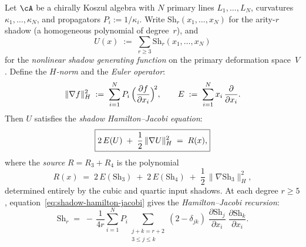 \begin{theorem}
\label{thm:hamilton-jacobi-shadow}
\ClaimStatusProvedHere
{}
Let $\cA$ be a chirally Koszul algebra with $N$ primary lines
$L_1, \dotsc, L_N$, curvatures
$\kappa_1, \dotsc, \kappa_N$, and propagators
$P_i := 1/\kappa_i$.  Write
$\mathrm{Sh}_r(x_1, \dotsc, x_N)$ for the arity-$r$ shadow
\textup{(}a homogeneous polynomial of degree~$r$\textup{)}, and
\[
  U(x) \;:=\; \sum_{r \geq 3} \mathrm{Sh}_r(x_1, \dotsc, x_N)
\]
for the \emph{nonlinear shadow generating function} on the
primary deformation space~$V$.  Define the \emph{$H$-norm}
and the \emph{Euler operator}:
\begin{equation}\label{eq:hj-operators}
  \|\nabla f\|_H^2
  \;:=\;
  \sum_{i=1}^N P_i\,
  \Bigl(\frac{\partial f}{\partial x_i}\Bigr)^{\!2},
  \qquad
  E \;:=\;
  \sum_{i=1}^N x_i\,\frac{\partial}{\partial x_i}.
\end{equation}
Then $U$ satisfies the \emph{shadow Hamilton--Jacobi equation}:
\begin{equation}\label{eq:shadow-hamilton-jacobi}
  \boxed{%
  2\,E(U)
  \;+\;
  \frac{1}{2}\,\|\nabla U\|_H^2
  \;=\;
  R(x),}
\end{equation}
where the \emph{source} $R = R_3 + R_4$ is the polynomial
\begin{equation}\label{eq:shadow-hj-source}
  R(x)
  \;=\;
  2\,E(\mathrm{Sh}_3)
  \;+\;
  2\,E(\mathrm{Sh}_4)
  \;+\;
  \frac{1}{2}\,\|\nabla \mathrm{Sh}_3\|_H^2,
\end{equation}
determined entirely by the cubic and quartic input shadows.
At each degree $r \geq 5$,
equation~\eqref{eq:shadow-hamilton-jacobi} gives the
\emph{Hamilton--Jacobi recursion}:
\begin{equation}\label{eq:shadow-hj-recursion}
  \mathrm{Sh}_r
  \;=\;
  -\,\frac{1}{4r}
  \sum_{i=1}^N P_i
  \!\!\!\sum_{\substack{j + k = r + 2 \\ 3 \leq j \leq k}}
  \!\!(2 - \delta_{jk})\;
  \frac{\partial \mathrm{Sh}_j}{\partial x_i}\;
  \frac{\partial \mathrm{Sh}_k}{\partial x_i}.
\end{equation}
\end{theorem}

